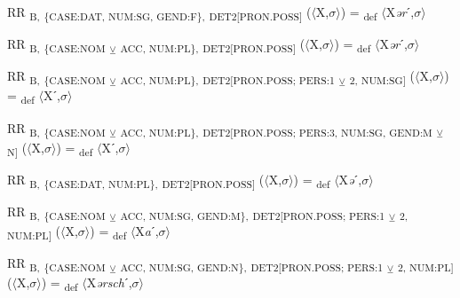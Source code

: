 {\begin{exe}
 RR \textsubscript{B,} \textsubscript{\{CASE:DAT, NUM:SG, GEND:F\},} \textsubscript{DET2[PRON.POSS]} ($\langle$X,$\sigma $$\rangle$) = \textsubscript{def} $\langle$X\textit{ər}ˊ,$\sigma $$\rangle$
\end{exe}

\begin{exe}
 RR \textsubscript{B,} \textsubscript{\{CASE:NOM} \textsubscript{${\veebar}$}\textsubscript{  ACC, NUM:PL\},} \textsubscript{DET2[PRON.POSS]} ($\langle$X,$\sigma $$\rangle$) = \textsubscript{def} $\langle$X\textit{ər}ˊ,$\sigma $$\rangle$
\end{exe}

\begin{exe}
 RR \textsubscript{B,} \textsubscript{\{CASE:NOM} \textsubscript{${\veebar}$}\textsubscript{  ACC, NUM:PL\},} \textsubscript{DET2[PRON.POSS; PERS:1} \textsubscript{${\veebar}$}\textsubscript{ 2, NUM:SG]} ($\langle$X,$\sigma $$\rangle$) = \textsubscript{def} $\langle$Xˊ,$\sigma $$\rangle$
\end{exe}

\begin{exe}
 RR \textsubscript{B,} \textsubscript{\{CASE:NOM} \textsubscript{${\veebar}$}\textsubscript{  ACC, NUM:PL\},} \textsubscript{DET2[PRON.POSS; PERS:3, NUM:SG, GEND:M} \textsubscript{${\veebar}$}\textsubscript{ N]} ($\langle$X,$\sigma $$\rangle$) = \textsubscript{def} $\langle$Xˊ,$\sigma $$\rangle$
\end{exe}

\begin{exe}
 RR \textsubscript{B,} \textsubscript{\{CASE:DAT, NUM:PL\},} \textsubscript{DET2[PRON.POSS]} ($\langle$X,$\sigma $$\rangle$) = \textsubscript{def} $\langle$X\textit{ə}ˊ,$\sigma $$\rangle$
\end{exe}

\begin{exe}
 RR \textsubscript{B,} \textsubscript{\{CASE:NOM} \textsubscript{${\veebar}$}\textsubscript{  ACC, NUM:SG, GEND:M\},} \textsubscript{DET2[PRON.POSS; PERS:1} \textsubscript{${\veebar}$}\textsubscript{ 2, NUM:PL]} ($\langle$X,$\sigma $$\rangle$) = \textsubscript{def} $\langle$X\textit{a}ˊ,$\sigma $$\rangle$
\end{exe}

\begin{exe}
 RR \textsubscript{B,} \textsubscript{\{CASE:NOM} \textsubscript{${\veebar}$}\textsubscript{  ACC, NUM:SG, GEND:N\},} \textsubscript{DET2[PRON.POSS; PERS:1} \textsubscript{${\veebar}$}\textsubscript{ 2, NUM:PL]} ($\langle$X,$\sigma $$\rangle$) = \textsubscript{def} $\langle$X\textit{ərsch}ˊ,$\sigma $$\rangle$
\end{exe}

}
